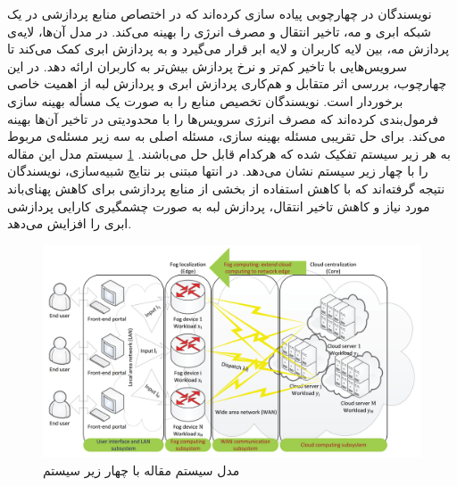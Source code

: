     نویسندگان در \cite{deng2016optimal} چهارچوبی پیاده سازی کرده‌اند که در اختصاص منابع پردازشی در یک شبکه ابری و مه، تاخیر انتقال و مصرف انرژی را بهینه می‌کند.
    در مدل آن‌ها، لایه‌ی پردازش مه، بین لایه کاربران و لایه‌ ابر قرار می‌گیرد و به پردازش ابری کمک می‌کند تا سرویس‌هایی با تاخیر کم‌تر و نرخ پردازش بیش‌تر به کاربران ارائه دهد.
    در این چهارچوب، بررسی اثر متقابل و هم‌کاری پردازش ابری و پردازش لبه از اهمیت خاصی برخوردار است.
    نویسندگان تخصیص منابع را به صورت یک مسأله بهینه سازی فرمول‌بندی کرده‌اند که مصرف انرژی سرویس‌ها را با محدودیتی در تاخیر آن‌ها بهینه می‌کند.
    برای حل تقریبی مسئله بهینه سازی، مسئله اصلی به سه زیر مسئله‌ی مربوط به هر زیر سیستم تفکیک شده که هرکدام قابل حل می‌باشند.
    \cref{fig:chapter_2:system_model_deng2016optimal} سیستم مدل این مقاله را با چهار زیر سیستم نشان می‌دهد.
    در انتها مبتنی بر نتایج شبیه‌سازی، نویسندگان نتیجه گرفته‌اند که با کاهش استفاده از بخشی از منابع پردازشی برای کاهش پهنای‌باند مورد نیاز و کاهش تاخیر انتقال، پردازش لبه به صورت چشمگیری کارایی پردازشی ابری را افزایش می‌دهد.

    \begin{figure}[h]
      \centerline{\includegraphics[width=11.3cm]{graphics/chapter_2/system_model_deng2016optimal}}
      \caption{مدل سیستم مقاله \cite{deng2016optimal} با چهار زیر سیستم}
      \label{fig:chapter_2:system_model_deng2016optimal}
    \end{figure}

